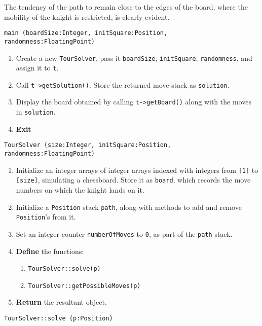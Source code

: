 The tendency of the path to remain close to the edges of the board, where the mobility of the knight is restricted, is clearly evident.

\algorithm
{\tt main (boardSize:Integer, initSquare:Position, randomness:FloatingPoint)}
\begin{enumerate}
	\item	Create a new {\tt TourSolver}, pass it {\tt boardSize}, {\tt initSquare}, {\tt randomness},
			and assign it to {\tt t}.
	\item	Call {\tt t->getSolution()}. Store the returned move stack as {\tt solution}.
	\item	Display the board obtained by calling {\tt t->getBoard()} along with the moves in {\tt solution}.
	\item	{\bf Exit}
\end{enumerate}
\vspace{8mm}
{\tt TourSolver (size:Integer, initSquare:Position, randomness:FloatingPoint)}
\begin{enumerate}
	\item	Initialize an integer arrays of integer arrays indexed with integers from {\tt [1]} to 
			{\tt [size]}, simulating a chessboard. Store it as {\tt board}, which records the 
			move numbers on which the knight lands on it.
	\item	Initialize a {\tt Position} stack {\tt path}, along with methods to add and remove {\tt Position}'s from it.
	\item	Set an integer counter {\tt numberOfMoves} to {\tt 0}, as part of the {\tt path} stack.
	\item	{\bf Define} the functions: 
	\begin{enumerate}
		\item	{\tt TourSolver::solve(p)}
		\item	{\tt TourSolver::getPossibleMoves(p)}
	\end{enumerate}
	\item	{\bf Return} the resultant object.
\end{enumerate}
\vspace{5mm}
{\tt TourSolver::solve (p:Position)}
